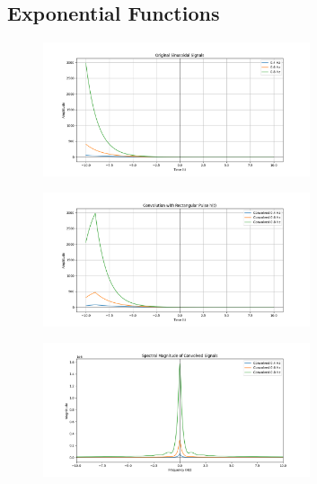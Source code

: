 \documentclass[a4paper,12pt]{article}
\begin{document}
\subsection*{Exponential Functions}
\begin{figure}[H]
    \centering
    \includegraphics[width=0.7\textwidth]{figs/exp1.png}
\end{figure}
\begin{figure}[H]
    \centering
    \includegraphics[width=0.7\textwidth]{figs/exp2.png}
\end{figure}
\begin{figure}[H]
    \centering
    \includegraphics[width=0.7\textwidth]{figs/exp3.png}
\end{figure}
\end{document}
